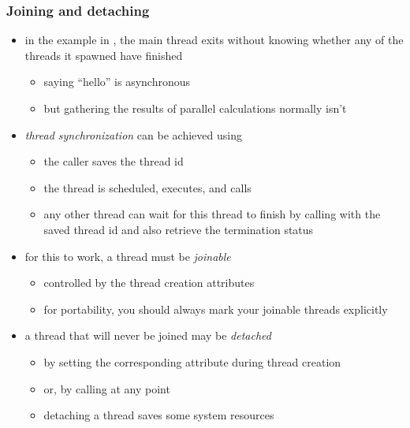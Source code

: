 \begin{frame}[fragile]
%
  \frametitle{Joining and detaching}
%
  \begin{itemize}
%
  \item in the example in , the main thread exits without knowing whether
    any of the threads it spawned have finished
    \begin{itemize}
    \item saying ``hello'' is asynchronous
    \item but gathering the results of parallel calculations normally isn't
    \end{itemize}
%
  \item {\em thread synchronization} can be achieved using 
    \begin{itemize}
      \item the  caller saves the thread id
      \item the thread is scheduled, executes, and calls 
      \item any other thread can wait for this thread to finish by calling
         with the saved thread id and also retrieve the termination
        status
    \end{itemize}
%
  \item for this to work, a thread must be {\em joinable}
    \begin{itemize}
    \item controlled by the thread creation attributes
    \item for portability, you should always mark your joinable threads explicitly
    \end{itemize}
%
%
    \item a thread that will never be joined may be {\em detached}
      \begin{itemize}
      \item by setting the corresponding attribute during thread creation
      \item or, by calling  at any point
      \item detaching a thread saves some system resources
      \end{itemize}
        
  \end{itemize}
%
\end{frame}

